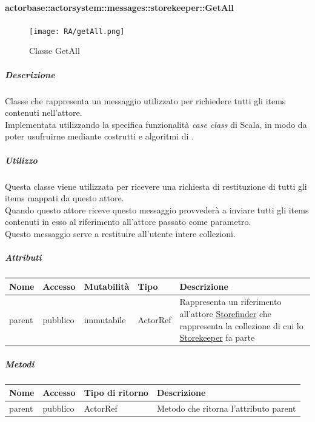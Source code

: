 \documentclass{scalatekids-article}
\begin{document}
\paragraph{actorbase::actorsystem::messages::storekeeper::GetAll}
\label{sec:actorbase::actorsystem::messages::storekeeper::GetAll}

\begin{figure}[H]
  \begin{center}
    \texttt{[image: RA/getAll.png]}
    \caption{Classe GetAll}
  \end{center}
\end{figure}

\subparagraph{Descrizione}
Classe che rappresenta un messaggio utilizzato per richiedere tutti gli items
contenuti nell'attore.\\Implementata utilizzando la specifica funzionalità \textit{case class} di Scala,
in modo da poter usufruirne mediante costrutti e algoritmi di
.

\subparagraph{Utilizzo}
Questa classe viene utilizzata per ricevere una richiesta di restituzione di
tutti gli items mappati da questo attore.\\Quando questo attore riceve questo
messaggio provvederà a inviare tutti gli items contenuti in esso al riferimento
all'attore passato come parametro.\\Questo messaggio serve a
restituire all'utente intere collezioni.

\subparagraph{Attributi}
\begin{tabular}{| p{2cm} | p{1.5cm} | p{2cm} | p{3cm} | p{8.5cm} |}
  \hline
  Nome & Accesso & Mutabilità & Tipo & Descrizione\\
  \hline
  parent & pubblico & immutabile & ActorRef & Rappresenta un riferimento all'attore \hyperref[sec:actorbase::actorsystem::actors::storefinder::Storefinder]{Storefinder} che rappresenta la collezione di cui lo \hyperref[sec:actorbase::actorsystem::actors::storekeeper::Storekeeper]{Storekeeper} fa parte\\
  \hline
\end{tabular}

\subparagraph{Metodi}
\begin{tabular}{| p{3cm} | p{1.5cm} | p{3.5cm} | p{9cm} |}
  \hline
  Nome & Accesso & Tipo di ritorno & Descrizione\\
  \hline
  parent & pubblico & ActorRef & Metodo che ritorna l'attributo parent\\
  \hline
\end{tabular}
\end{document}
